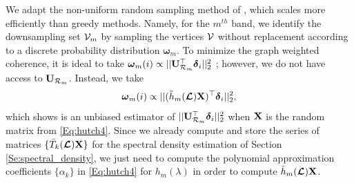 \documentclass[journal, 10pt]{IEEEtran}
\begin{document}
We adapt the non-uniform random sampling method of \cite{PuyTGV15}, which scales more efficiently than greedy methods. Namely, for the $m^{th}$ band, we identify the downsampling set ${\mathcal{V}}_m$ by sampling the vertices ${\mathcal{V}}$ without replacement according to a discrete probability distribution ${\boldsymbol \omega}_m$. To minimize the graph weighted coherence, it is ideal to take ${\boldsymbol \omega}_m(i) \propto ||{\bf U}_{{\cal R}_m}^{\top} {\boldsymbol \delta}_i ||_2^2$ \cite{PuyTGV15}; however, we do not have access to ${\bf U}_{{\cal R}_m}$. Instead, we take 
\begin{align}\label{Eq:samp_dist}
{\boldsymbol \omega}_m(i) \propto ||(\tilde{h}_m(\L){\bf X})^{\top} {\boldsymbol \delta}_i ||_2^2,
\end{align}
which \cite{PuyTGV15} shows is an unbiased estimator of $||{\bf U}_{{\cal R}_m}^{\top} {\boldsymbol \delta}_i ||_2^2$ when ${\bf X}$ is the random matrix from \eqref{Eq:hutch4}. Since we already compute and store the series of matrices $\{\bar{T}_k(\boldsymbol{\mathcal{L}}){\bf X}\}$ for the spectral density estimation of Section \ref{Se:spectral_density}, we just need to compute the polynomial approximation coefficients $\{\alpha_k\}$ in \eqref{Eq:hutch4} for $h_m(\lambda)$ in order to compute $\tilde{h}_m(\boldsymbol{\mathcal{L}}){\bf X}$.


\end{document}
